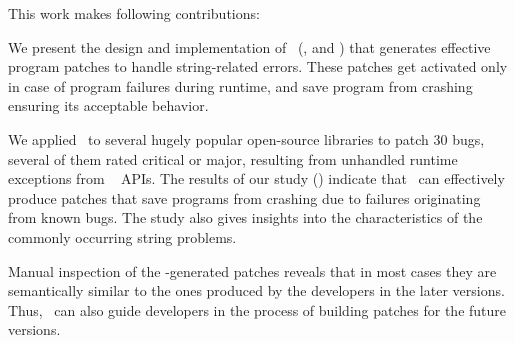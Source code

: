 This work makes following contributions:
\begin{mylist}
\item We present the design and implementation of \tool\
(,  and ) that
 generates effective program patches to handle string-related errors. These 
patches get activated only in case of program failures during runtime, and save
program from crashing ensuring its acceptable behavior.



\item We applied \tool\ to several hugely popular open-source libraries to patch
$30$ bugs, several of them rated critical or major, resulting from unhandled
runtime exceptions from \java\ \code{String} APIs. The results of our study
(\xref{sec:results}) indicate that \tool\ can effectively produce patches that
save programs from crashing due to failures originating from known bugs. The
study also gives insights into the characteristics of the commonly occurring
string problems.

\item Manual inspection of the \tool-generated patches reveals that in most
cases they are semantically similar to the ones produced by the developers in
the later versions. %
Thus, \tool\ can also guide developers in the process of building patches for
the future versions.
\end{mylist}










